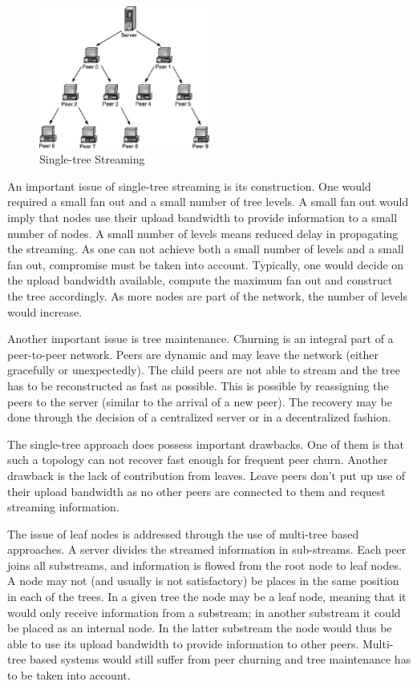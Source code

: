 \begin{figure}
  \centering
  \includegraphics[width=0.5\textwidth]{src/img/p2p-systems/single-tree-streaming}
  \caption{Single-tree Streaming}
  \label{fig:p2p-systems:single-tree-streaming}
\end{figure}

An important issue of single-tree streaming is its construction. One would
required a small fan out and a small number of tree levels. A small fan out
would imply that nodes use their upload bandwidth to provide information to a
small number of nodes. A small number of levels means reduced delay in
propagating the streaming. As one can not achieve both a small number of
levels and a small fan out, compromise must be taken into account. Typically,
one would decide on the upload bandwidth available, compute the maximum fan
out and construct the tree accordingly. As more nodes are part of the network,
the number of levels would increase.

Another important issue is tree maintenance. Churning is an integral part of
a peer-to-peer network. Peers are dynamic and may leave the network (either
gracefully or unexpectedly). The child peers are not able to stream and the
tree has to be reconstructed as fast as possible. This is possible by
reassigning the peers to the server (similar to the arrival of a new peer).
The recovery may be done through the decision of a centralized server or in a
decentralized fashion.

The single-tree approach does possess important drawbacks. One of them is that
such a topology can not recover fast enough for frequent peer churn. Another
drawback is the lack of contribution from leaves. Leave peers don't put up use
of their upload bandwidth as no other peers are connected to them and request
streaming information.

The issue of leaf nodes is addressed through the use of multi-tree based
approaches. A server divides the streamed information in sub-streams. Each
peer joins all substreams, and information is flowed from the root node to
leaf nodes. A node may not (and usually is not satisfactory) be places in the
same position in each of the trees. In a given tree the node may be a leaf
node, meaning that it would only receive information from a substream; in
another substream it could be placed as an internal node. In the latter
substream the node would thus be able to use its upload bandwidth to provide
information to other peers. Multi-tree based systems would still suffer from
peer churning and tree maintenance has to be taken into account.

